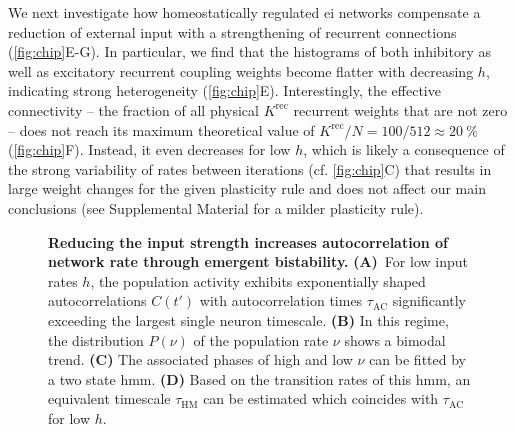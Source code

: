 We next investigate how homeostatically regulated \gls{ei} networks compensate a reduction of external input with a strengthening of recurrent connections (\cref{fig:chip}E-G).
In particular, we find that the histograms of both inhibitory as well as excitatory recurrent coupling weights become flatter with decreasing $h$, indicating strong heterogeneity (\cref{fig:chip}E).
Interestingly, the effective connectivity -- the fraction of all physical $K^\mathrm{rec}$ recurrent weights that are not zero -- does not reach its maximum theoretical value of $K^\mathrm{rec}/N = 100 / 512 \approx \SI{20}{\percent}$ (\cref{fig:chip}F).
Instead, it even decreases for low $h$, which is likely a consequence of the strong variability of rates between iterations (cf. \cref{fig:chip}C) that results in large weight changes for the given plasticity rule and does not affect our main conclusions (see Supplemental Material for a milder plasticity rule).

\begin{figure}[ht]
	\centering
	\caption{%
		\textbf{Reducing the input strength increases autocorrelation of network rate through emergent bistability.}
        \mbox{\textbf{(A)} For} low input rates $h$, the population activity exhibits exponentially shaped autocorrelations $C(t')$ with autocorrelation times $\tau_\mathrm{AC}$ significantly exceeding the largest single neuron timescale.
		\textbf{(B)} In this regime, the distribution $P(\nu)$ of the population rate $\nu$ shows a bimodal trend.
		\textbf{(C)} The associated phases of high and low $\nu$ can be fitted by a two state \acrshort{hmm}.
		\textbf{(D)} Based on the transition rates of this \acrshort{hmm}, an equivalent timescale $\tau_\mathrm{HM}$ can be estimated which coincides with $\tau_\mathrm{AC}$ for low $h$.
	}
	\label{fig:time_scale}
\end{figure}

